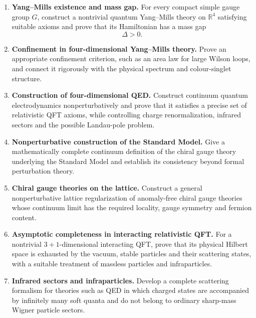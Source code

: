 \documentclass{article}
\begin{document}
\begin{enumerate}[label=\textbf{QF\arabic*.},leftmargin=*]

\item \precise{} \textbf{Yang--Mills existence and mass gap.}
For every compact simple gauge group \(G\), construct a nontrivial
quantum Yang--Mills theory on \(\mathbb R^{4}\) satisfying suitable
axioms and prove that its Hamiltonian has a mass gap
\[
    \Delta>0 .
\]

\item \precise{} \textbf{Confinement in four-dimensional Yang--Mills theory.}
Prove an appropriate confinement criterion, such as an area law for
large Wilson loops, and connect it rigorously with the physical
spectrum and colour-singlet structure.

\item \precise{} \textbf{Construction of four-dimensional QED.}
Construct continuum quantum electrodynamics nonperturbatively and prove
that it satisfies a precise set of relativistic QFT axioms, while
controlling charge renormalization, infrared sectors and the possible
Landau-pole problem.

\item \precise{} \textbf{Nonperturbative construction of the Standard Model.}
Give a mathematically complete continuum definition of the chiral gauge
theory underlying the Standard Model and establish its consistency
beyond formal perturbation theory.

\item \precise{} \textbf{Chiral gauge theories on the lattice.}
Construct a general nonperturbative lattice regularization of
anomaly-free chiral gauge theories whose continuum limit has the
required locality, gauge symmetry and fermion content.

\item \precise{} \textbf{Asymptotic completeness in interacting relativistic QFT.}
For a nontrivial \(3+1\)-dimensional interacting QFT, prove that its
physical Hilbert space is exhausted by the vacuum, stable particles and
their scattering states, with a suitable treatment of massless
particles and infraparticles.

\item \formalism{} \textbf{Infrared sectors and infraparticles.}
Develop a complete scattering formalism for theories such as QED in
which charged states are accompanied by infinitely many soft quanta and
do not belong to ordinary sharp-mass Wigner particle sectors.


\end{enumerate}
\end{document}
